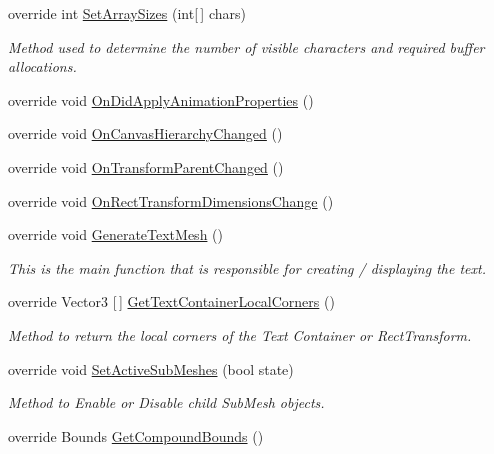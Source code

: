 \begin{DoxyCompactItemize}
override int \mbox{\hyperlink{class_t_m_pro_1_1_text_mesh_pro_u_g_u_i_aecb6caf598d9516490f37f0277326eb6}{Set\+Array\+Sizes}} (int\mbox{[}$\,$\mbox{]} chars)
\begin{DoxyCompactList}\small\item\em Method used to determine the number of visible characters and required buffer allocations. \end{DoxyCompactList}\item 
override void \mbox{\hyperlink{class_t_m_pro_1_1_text_mesh_pro_u_g_u_i_a3dbf1232fa23263480cb91202b8bb0d8}{On\+Did\+Apply\+Animation\+Properties}} ()
\item 
override void \mbox{\hyperlink{class_t_m_pro_1_1_text_mesh_pro_u_g_u_i_af06e3849f8cdb350ef904848487afe31}{On\+Canvas\+Hierarchy\+Changed}} ()
\item 
override void \mbox{\hyperlink{class_t_m_pro_1_1_text_mesh_pro_u_g_u_i_a2234b62a5f2bf5fe521e811c5ec4441a}{On\+Transform\+Parent\+Changed}} ()
\item 
override void \mbox{\hyperlink{class_t_m_pro_1_1_text_mesh_pro_u_g_u_i_a734589d21ffb7d2ef913b96173b0f432}{On\+Rect\+Transform\+Dimensions\+Change}} ()
\item 
override void \mbox{\hyperlink{class_t_m_pro_1_1_text_mesh_pro_u_g_u_i_ae43d87969cffe98fbaea5edabc0d55dd}{Generate\+Text\+Mesh}} ()
\begin{DoxyCompactList}\small\item\em This is the main function that is responsible for creating / displaying the text. \end{DoxyCompactList}\item 
override Vector3 \mbox{[}$\,$\mbox{]} \mbox{\hyperlink{class_t_m_pro_1_1_text_mesh_pro_u_g_u_i_a9061f9387fbed4095b88a7ad98a9bf90}{Get\+Text\+Container\+Local\+Corners}} ()
\begin{DoxyCompactList}\small\item\em Method to return the local corners of the Text Container or Rect\+Transform. \end{DoxyCompactList}\item 
override void \mbox{\hyperlink{class_t_m_pro_1_1_text_mesh_pro_u_g_u_i_a955de616cf76ff0886112394b6289d85}{Set\+Active\+Sub\+Meshes}} (bool state)
\begin{DoxyCompactList}\small\item\em Method to Enable or Disable child Sub\+Mesh objects. \end{DoxyCompactList}\item 
override Bounds \mbox{\hyperlink{class_t_m_pro_1_1_text_mesh_pro_u_g_u_i_aec6bee5f25f07eaeeefaa5f6cd6ad35c}{Get\+Compound\+Bounds}} ()

\end{DoxyCompactItemize}
